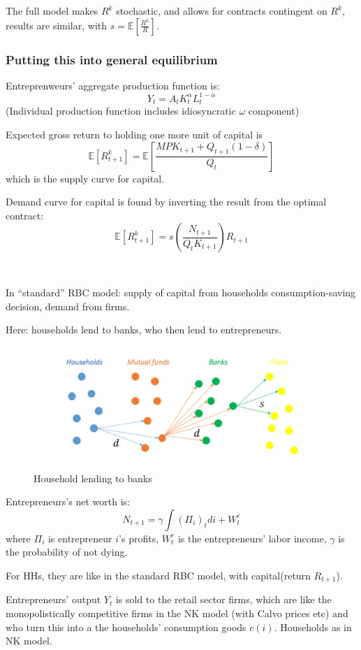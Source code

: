 The full model makes $R^k$ stochastic, and allows for contracts contingent on $R^k$, results are similar, with $s = \mathbb{E}\left[\frac{R^k}{R}\right]$.

\subsubsection{Putting this into general equilibrium}
Entreprenweurs' aggregate production function is:
\[Y_t = A_t K_t^{\alpha}L_t^{1-\alpha } \]
(Individual production function includes idiosyncratic $\omega $ component)

Expected gross return to holding one more unit of capital is
\[\mathbb{E}[R^k_{t+1}] = \mathbb{E} \left[\frac{MP K_{t+1} + Q_{t+1}(1-\delta) }{Q_t}\right] \]
which is the supply curve for capital.

Demand curve for capital is found by inverting the result from
the optimal contract:
\[\mathbb{E}[R_{t+1}^k] = s\left(\frac{N_{t+1} }{Q_t K_{t+1} }\right) R_{t+1} \]

\begin{note}
    \ 

    In “standard” RBC model: supply of capital from households consumption-saving decision, 
    demand from firms.

    Here: households lend to banks, who then lend to entrepreneurs. 
\end{note}
\begin{figure}[!htbp]
    \includegraphics[width=\textwidth]{figures/HHK-lending.png}
    \caption{Household lending to banks}
\end{figure}
Entrepreneurs's net worth is:
\[
N_{t+1} = \gamma \int (\Pi_i )_t d i + W_t^e
\]
where $\Pi_i$ is entrepreneur $i$'s profits, $W_t^e$ is the entrepreneurs' labor income, $\gamma$ is the probability of not dying.

For HHs, they are like in the standard RBC model, with capital(return $R_{t+1}$).

Entrepreneurs’ output $Y_t$ is sold to the retail sector firms,
which are like the monopolistically competitive firms in the
NK model (with Calvo prices etc) and who turn this into a the
households’ consumption goods $c(i)$. Households as in NK
model.

